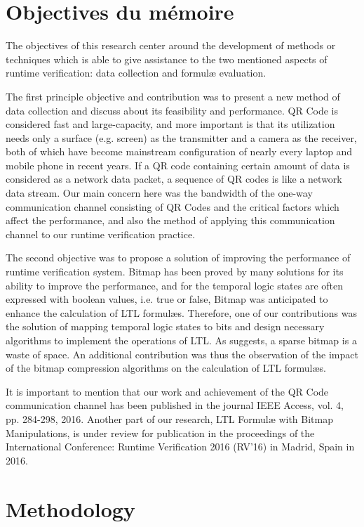 \section{Objectives du mémoire}

The objectives of this research center around the development of methods or techniques which is able to give assistance to the two mentioned aspects of runtime verification: data collection and formul\ae{} evaluation.

The first principle objective and contribution was to present a new method of data collection and discuss about its feasibility and performance. QR Code is considered fast and large-capacity, and more important is that its utilization needs only a surface (e.g. screen) as the transmitter and a camera as the receiver, both of which have become mainstream configuration of nearly every laptop and mobile phone in recent years. If a QR code containing certain amount of data is considered as a network data packet, a sequence of QR codes is like a network data stream. Our main concern here was the bandwidth of the one-way communication channel consisting of QR Codes and the critical factors which affect the performance, and also the method of applying this communication channel to our runtime verification practice.

The second objective was to propose a solution of improving the performance of runtime verification system. Bitmap has been proved by many solutions for its ability to improve the performance, and for the temporal logic states are often expressed with boolean values, i.e. true or false, Bitmap was anticipated to enhance the calculation of LTL formul\ae{}s. Therefore, one of our contributions was the solution of mapping temporal logic states to bits and design necessary algorithms to implement the operations of LTL. As \cite{lemire2014} suggests, a sparse bitmap is a waste of space. An additional contribution was thus the observation of the impact of the bitmap compression algorithms on the calculation of LTL formul\ae{}s.

It is important to mention that our work and achievement of the QR Code communication channel has been published in the journal IEEE Access, vol. 4, pp. 284-298, 2016. Another part of our research, LTL Formul\ae{} with Bitmap Manipulations, is under review for publication in the proceedings of the International Conference: Runtime Verification 2016 (RV'16) in Madrid, Spain in 2016.

\section{Methodology}

